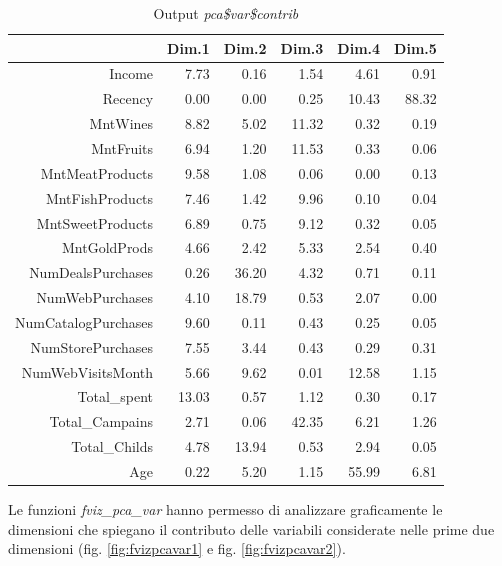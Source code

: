 \documentclass[letterpaper,11pt]{article}
\begin{document}
\begin{table}[H]
\centering
\begin{tabular}{rrrrrr}
  \hline
 & Dim.1 & Dim.2 & Dim.3 & Dim.4 & Dim.5 \\ 
  \hline
Income & 7.73 & 0.16 & 1.54 & 4.61 & 0.91 \\ 
  Recency & 0.00 & 0.00 & 0.25 & 10.43 & 88.32 \\ 
  MntWines & 8.82 & 5.02 & 11.32 & 0.32 & 0.19 \\ 
  MntFruits & 6.94 & 1.20 & 11.53 & 0.33 & 0.06 \\ 
  MntMeatProducts & 9.58 & 1.08 & 0.06 & 0.00 & 0.13 \\ 
  MntFishProducts & 7.46 & 1.42 & 9.96 & 0.10 & 0.04 \\ 
  MntSweetProducts & 6.89 & 0.75 & 9.12 & 0.32 & 0.05 \\ 
  MntGoldProds & 4.66 & 2.42 & 5.33 & 2.54 & 0.40 \\ 
  NumDealsPurchases & 0.26 & 36.20 & 4.32 & 0.71 & 0.11 \\ 
  NumWebPurchases & 4.10 & 18.79 & 0.53 & 2.07 & 0.00 \\ 
  NumCatalogPurchases & 9.60 & 0.11 & 0.43 & 0.25 & 0.05 \\ 
  NumStorePurchases & 7.55 & 3.44 & 0.43 & 0.29 & 0.31 \\ 
  NumWebVisitsMonth & 5.66 & 9.62 & 0.01 & 12.58 & 1.15 \\ 
  Total\_spent & 13.03 & 0.57 & 1.12 & 0.30 & 0.17 \\ 
  Total\_Campains & 2.71 & 0.06 & 42.35 & 6.21 & 1.26 \\ 
  Total\_Childs & 4.78 & 13.94 & 0.53 & 2.94 & 0.05 \\ 
  Age & 0.22 & 5.20 & 1.15 & 55.99 & 6.81 \\ 
   \hline
\end{tabular}
\caption{Output \textit{pca\$var\$contrib}}
\label{fig:pca$var$contrib}
\end{table}
Le funzioni \textit{fviz\_pca\_var} hanno permesso di analizzare graficamente le dimensioni che spiegano il contributo delle variabili considerate nelle prime due dimensioni (fig. \ref{fig:fvizpcavar1} e fig. \ref{fig:fvizpcavar2}).
\end{document}
